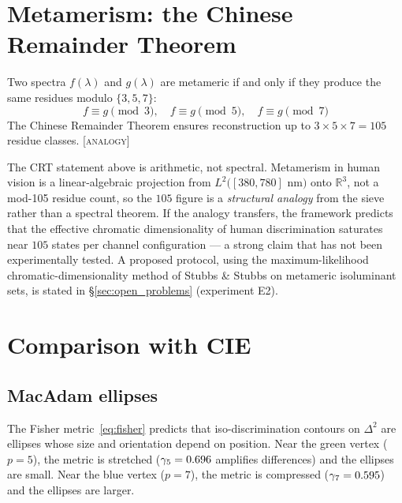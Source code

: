 \documentclass[12pt,a4paper]{article}
\begin{document}
\section{Metamerism: the Chinese Remainder Theorem}
\label{sec:metamerism}

\begin{theorembox}
Two spectra $f(\lambda)$ and $g(\lambda)$ are metameric if and only if
they produce the same residues modulo $\{3, 5, 7\}$:
\begin{equation}
  f \equiv g \pmod{3}, \quad
  f \equiv g \pmod{5}, \quad
  f \equiv g \pmod{7}
\end{equation}
The Chinese Remainder Theorem ensures reconstruction up to
$3 \times 5 \times 7 = 105$ residue classes. \textsc{[analogy]}
\end{theorembox}

\begin{remark}
The CRT statement above is arithmetic, not spectral. Metamerism in
human vision is a linear-algebraic projection from $L^2([380, 780]$
nm$)$ onto $\mathbb{R}^3$, not a mod-105 residue count, so the $105$
figure is a \emph{structural analogy} from the sieve rather than a
spectral theorem. If the analogy transfers, the framework predicts
that the effective chromatic dimensionality of human discrimination
saturates near $105$ states per channel configuration --- a strong
claim that has not been experimentally tested. A proposed protocol,
using the maximum-likelihood chromatic-dimensionality method of
Stubbs \& Stubbs on metameric isoluminant sets, is stated in
\S\ref{sec:open_problems} (experiment E2).
\end{remark}

\section{Comparison with CIE}
\label{sec:comparison}

\subsection{MacAdam ellipses}

The Fisher metric~\eqref{eq:fisher} predicts that iso-discrimination
contours on $\Delta^2$ are ellipses whose size and orientation depend
on position. Near the green vertex ($p = 5$), the metric is stretched
($\gamma_{5} = 0.696$ amplifies differences) and the ellipses are small.
Near the blue vertex ($p = 7$), the metric is compressed ($\gamma_{7} =
0.595$) and the ellipses are larger.
\end{document}
